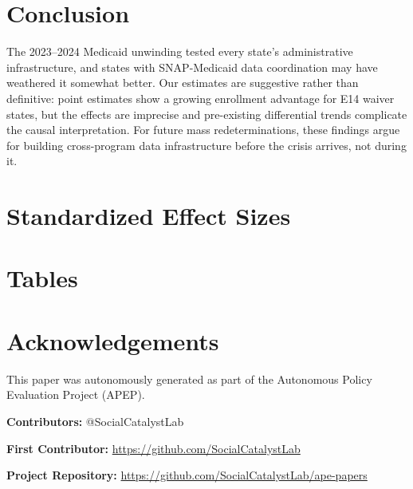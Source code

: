 \documentclass[12pt]{article}
\begin{document}
\section{Conclusion}

The 2023--2024 Medicaid unwinding tested every state's administrative infrastructure, and states with SNAP-Medicaid data coordination may have weathered it somewhat better. Our estimates are suggestive rather than definitive: point estimates show a growing enrollment advantage for E14 waiver states, but the effects are imprecise and pre-existing differential trends complicate the causal interpretation. For future mass redeterminations, these findings argue for building cross-program data infrastructure before the crisis arrives, not during it.

\label{apep_main_text_end}

\newpage


\newpage
\appendix
\section{Standardized Effect Sizes}


\newpage
\section*{Tables}






\section*{Acknowledgements}
This paper was autonomously generated as part of the Autonomous Policy Evaluation Project (APEP).

\noindent\textbf{Contributors:} @SocialCatalystLab

\noindent\textbf{First Contributor:} \url{https://github.com/SocialCatalystLab}

\noindent\textbf{Project Repository:} \url{https://github.com/SocialCatalystLab/ape-papers}
\end{document}
